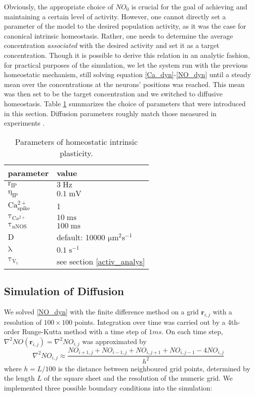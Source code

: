 \documentclass[10pt,a4paper]{article}
\begin{document}
Obviously, the appropriate choice of $NO_0$ is crucial for the goal of achieving and maintaining a certain level of activity. However, one cannot directly set a parameter of the model to the desired population activity, as it was the case for canonical intrinsic homeostasis. Rather, one needs to determine the average concentration \textit{associated} with the desired activity and set it as a target concentration. Though it is possible to derive this relation in an analytic fashion, for practical purposes of the simulation, we let the system run with the previous homeostatic mechanism, still solving equation \eqref{Ca_dyn}-\eqref{NO_dyn} until a steady mean over the concentrations at the neurons' positions was reached. This mean was then set to be the target concentration and we switched to diffusive homeostasis. Table \ref{Params_IP} summarizes the choice of parameters that were introduced in this section. Diffusion parameters roughly match those measured in experiments \cite{Philippides_2000}.
\begin{table}
\begin{tabular}{|l|l|}
\hline
\textbf{parameter} & \textbf{value} \\
\hline
$\mathrm{r_{IP}}$ & $\mathrm{3\;Hz}$ \\
\hline
$\mathrm{\eta_{IP}}$ & $\mathrm{0.1\;mV}$ \\
\hline
$\mathrm{Ca^{2+}_{spike}}$ & 1 \\ \hline
$\mathrm{\tau_{Ca^{2+}}}$ &  $\mathrm{10\;ms}$ \\
\hline
$\mathrm{\tau_{nNOS}}$ & $\mathrm{100\;ms}$ \\
\hline
$\mathrm{D}$ & default: 10000 $\mathrm{\mu m^2 s^{-1}}$ \\
\hline 
$\mathrm{\lambda}$ & $\mathrm{0.1\;s^{-1}}$ \\
\hline
$\mathrm{\tau_{V_t}}$ & see section \ref{activ_analys} \\
\hline
\end{tabular}
\caption{Parameters of homeostatic intrinsic plasticity.}
\label{Params_IP}
\end{table}

\subsection{Simulation of Diffusion}

We solved \eqref{NO_dyn} with the finite difference method on a grid $\mathbf{r}_{i,j}$ with a resolution of $100\times 100$ points. Integration over time was carried out by a 4th-order Runge-Kutta method with a time step of $1 ms$. On each time step, $\nabla^2 NO(\mathbf{r}_{i,j}) = \nabla^2 NO_{i,j}$ was approximated by
\begin{equation}
\nabla^2 NO_{i,j} \approx \frac{NO_{i+1,j}+NO_{i-1,j}+NO_{i,j+1}+NO_{i,j-1}-4NO_{i,j}}{h^2}
\label{Laplace_Numeric}
\end{equation}
where $h = L/100$ is the distance between neighboured grid points, determined by the length $L$ of the square sheet and the resolution of the numeric grid. We implemented three possible boundary conditions into the simulation:
\end{document}
